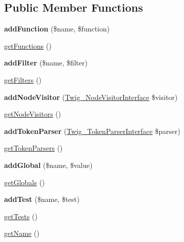 \subsection*{Public Member Functions}
\begin{DoxyCompactItemize}
\item 
\hypertarget{class_twig___extension___staging_aa1024a293b0cd6f0978050e4546d2b35}{}{\bfseries add\+Function} (\$name, \$function)\label{class_twig___extension___staging_aa1024a293b0cd6f0978050e4546d2b35}

\item 
\hyperlink{class_twig___extension___staging_a131c2522f07821f77cd1d038c216031b}{get\+Functions} ()
\item 
\hypertarget{class_twig___extension___staging_a02ad22fc2cdd381d7f7dc0808d496b1b}{}{\bfseries add\+Filter} (\$name, \$filter)\label{class_twig___extension___staging_a02ad22fc2cdd381d7f7dc0808d496b1b}

\item 
\hyperlink{class_twig___extension___staging_a428d91319fc73d3038784cf5436936b6}{get\+Filters} ()
\item 
\hypertarget{class_twig___extension___staging_adc294d7c409f47d2c26847601897c6db}{}{\bfseries add\+Node\+Visitor} (\hyperlink{interface_twig___node_visitor_interface}{Twig\+\_\+\+Node\+Visitor\+Interface} \$visitor)\label{class_twig___extension___staging_adc294d7c409f47d2c26847601897c6db}

\item 
\hyperlink{class_twig___extension___staging_aec02093179d390d22ae4083f23a1d74a}{get\+Node\+Visitors} ()
\item 
\hypertarget{class_twig___extension___staging_a8f805d29eac2b8ce1da513e9390952f3}{}{\bfseries add\+Token\+Parser} (\hyperlink{interface_twig___token_parser_interface}{Twig\+\_\+\+Token\+Parser\+Interface} \$parser)\label{class_twig___extension___staging_a8f805d29eac2b8ce1da513e9390952f3}

\item 
\hyperlink{class_twig___extension___staging_a8fd35903c3d01c0f0078f59d142eb063}{get\+Token\+Parsers} ()
\item 
\hypertarget{class_twig___extension___staging_ad967754d97f0c9ccd329246fa9255808}{}{\bfseries add\+Global} (\$name, \$value)\label{class_twig___extension___staging_ad967754d97f0c9ccd329246fa9255808}

\item 
\hyperlink{class_twig___extension___staging_ae3a26252ce6efe503698085a7ed69dad}{get\+Globals} ()
\item 
\hypertarget{class_twig___extension___staging_a4c647ddc962509158de8a6a4b404ca54}{}{\bfseries add\+Test} (\$name, \$test)\label{class_twig___extension___staging_a4c647ddc962509158de8a6a4b404ca54}

\item 
\hyperlink{class_twig___extension___staging_a7e247dd31cc8d37a6c97353a062a0080}{get\+Tests} ()
\item 
\hyperlink{class_twig___extension___staging_a3d0963e68bb313b163a73f2803c64600}{get\+Name} ()
\end{DoxyCompactItemize}
